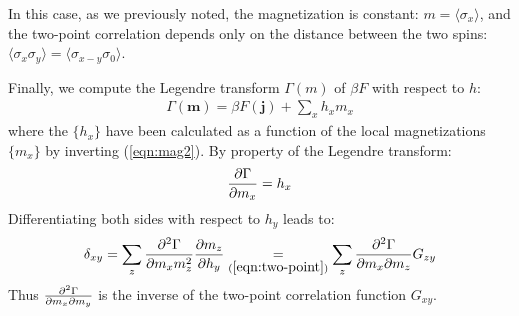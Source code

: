 \documentclass[../../main.tex]{subfiles}
\begin{document}
In this case, as we previously noted, the magnetization is constant: $m = \langle \sigma_x \rangle$, and the two-point correlation depends only on the distance between the two spins: $\langle \sigma_x \sigma_y \rangle = \langle \sigma_{x-y} \sigma_0 \rangle$.

\medskip

Finally, we compute the Legendre transform $\Gamma(m)$ of $\beta F$ with respect to $h$:
\begin{align*}
    \Gamma(\bm{m}) = \beta F(\bm{j}) + \sum_x h_x m_x
\end{align*}
where the $\{h_x\}$ have been calculated as a function of the local magnetizations $\{m_x\}$ by inverting (\ref{eqn:mag2}). By property of the Legendre transform:
\begin{align*}
    \pdv{\Gamma}{m_x} = h_x
\end{align*}
Differentiating both sides with respect to $h_y$ leads to:
\begin{align*}
    \delta_{xy} = \sum_z \pdv[2]{\Gamma}{m_x m_z} \pdv{m_z}{h_y} \underset{(\ref{eqn:two-point})}{=} \sum_z \pdv[2]{\Gamma}{m_x}{m_z} G_{zy}
\end{align*}
Thus $\pdv[2]{\Gamma}{m_x}{m_y}$ is the inverse of the two-point correlation function $G_{xy}$. %
\end{document}

